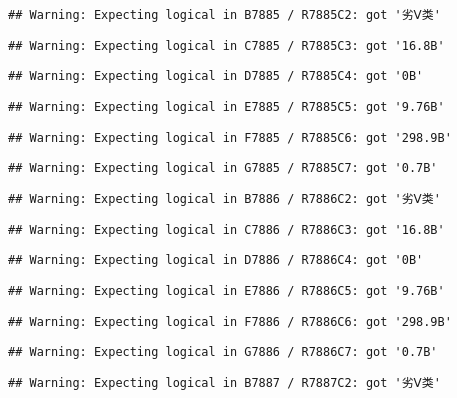 \documentclass[
]{article}
\begin{document}
\begin{verbatim}
## Warning: Expecting logical in B7885 / R7885C2: got '劣Ⅴ类'
\end{verbatim}

\begin{verbatim}
## Warning: Expecting logical in C7885 / R7885C3: got '16.8B'
\end{verbatim}

\begin{verbatim}
## Warning: Expecting logical in D7885 / R7885C4: got '0B'
\end{verbatim}

\begin{verbatim}
## Warning: Expecting logical in E7885 / R7885C5: got '9.76B'
\end{verbatim}

\begin{verbatim}
## Warning: Expecting logical in F7885 / R7885C6: got '298.9B'
\end{verbatim}

\begin{verbatim}
## Warning: Expecting logical in G7885 / R7885C7: got '0.7B'
\end{verbatim}

\begin{verbatim}
## Warning: Expecting logical in B7886 / R7886C2: got '劣Ⅴ类'
\end{verbatim}

\begin{verbatim}
## Warning: Expecting logical in C7886 / R7886C3: got '16.8B'
\end{verbatim}

\begin{verbatim}
## Warning: Expecting logical in D7886 / R7886C4: got '0B'
\end{verbatim}

\begin{verbatim}
## Warning: Expecting logical in E7886 / R7886C5: got '9.76B'
\end{verbatim}

\begin{verbatim}
## Warning: Expecting logical in F7886 / R7886C6: got '298.9B'
\end{verbatim}

\begin{verbatim}
## Warning: Expecting logical in G7886 / R7886C7: got '0.7B'
\end{verbatim}

\begin{verbatim}
## Warning: Expecting logical in B7887 / R7887C2: got '劣Ⅴ类'
\end{verbatim}
\end{document}
